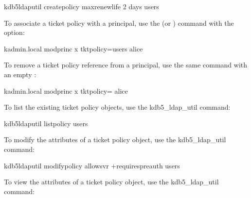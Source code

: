 \documentclass[letterpaper,10pt,english]{sphinxmanual}
\begin{document}
\begin{sphinxVerbatim}[commandchars=\\\{\}]
\PYGZdl{} kdb5\PYGZus{}ldap\PYGZus{}util create\PYGZus{}policy \PYGZhy{}maxrenewlife \PYGZdq{}2 days\PYGZdq{} users
\end{sphinxVerbatim}

\sphinxAtStartPar
To associate a ticket policy with a principal, use the
{\hyperref[\detokenize{admin/admin_commands/kadmin_local:kadmin-1}]{}}  (or ) command
with the  option:

\begin{sphinxVerbatim}[commandchars=\\\{\}]
\PYGZdl{} kadmin.local modprinc \PYGZhy{}x tktpolicy=users alice
\end{sphinxVerbatim}

\sphinxAtStartPar
To remove a ticket policy reference from a principal, use the same
command with an empty :

\begin{sphinxVerbatim}[commandchars=\\\{\}]
\PYGZdl{} kadmin.local modprinc \PYGZhy{}x tktpolicy= alice
\end{sphinxVerbatim}

\sphinxAtStartPar
To list the existing ticket policy objects, use the kdb5\_ldap\_util
 command:

\begin{sphinxVerbatim}[commandchars=\\\{\}]
\PYGZdl{} kdb5\PYGZus{}ldap\PYGZus{}util list\PYGZus{}policy
users
\end{sphinxVerbatim}

\sphinxAtStartPar
To modify the attributes of a ticket policy object, use the
kdb5\_ldap\_util  command:

\begin{sphinxVerbatim}[commandchars=\\\{\}]
\PYGZdl{} kdb5\PYGZus{}ldap\PYGZus{}util modify\PYGZus{}policy \PYGZhy{}allow\PYGZus{}svr +requires\PYGZus{}preauth users
\end{sphinxVerbatim}

\sphinxAtStartPar
To view the attributes of a ticket policy object, use the
kdb5\_ldap\_util  command:
\end{document}
